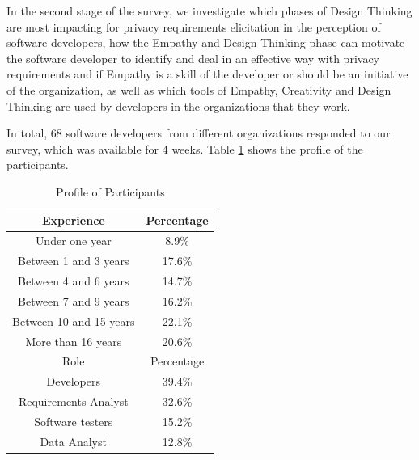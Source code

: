 \documentclass[conference]{IEEEtran}
\begin{document}

In the second stage of the survey, we investigate which phases of Design Thinking are most impacting for privacy requirements elicitation in the perception of software developers, how the Empathy and Design Thinking phase can motivate the software developer to identify and deal in an effective way with privacy requirements and if Empathy is a skill of the developer or should be an initiative of the organization, as well as which tools of Empathy, Creativity and Design Thinking are used by developers in the organizations that they work.


In total, 68 software developers from different organizations responded to our survey, which was available for 4 weeks. Table \ref{profile} shows the profile of the participants.

\begin{table}[!htb]
\renewcommand{\arraystretch}{1.3}
\caption{Profile of Participants}
\label{profile}
\centering
\begin{tabular}{|c|c|}
\hline
Experience & Percentage \\
\hline
Under one year & 8.9\%  \\ \hline
Between 1 and 3 years & 17.6\%  \\ \hline
Between 4 and 6 years & 14.7\%  \\ \hline
Between 7 and 9 years & 16.2\%  \\ \hline
Between 10 and 15 years & 22.1\%  \\ \hline
More than 16 years & 20.6\%  \\ \hline
Role & Percentage \\ \hline
Developers & 39.4\% \\ \hline
Requirements Analyst & 32.6\% \\ \hline
Software testers & 15.2\% \\ \hline
Data Analyst & 12.8\% \\ \hline
\end{tabular}
\end{table}
\end{document}
